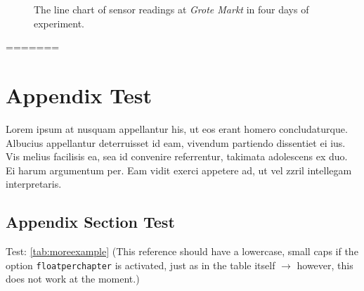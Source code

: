 \begin{figure}[H]
\begin{adjustwidth}{-2cm}{}
{{    }
  }
  \end{adjustwidth}
  \caption[The line chart of sensor readings at Grote Markt.]
  {The line chart of sensor readings at \textit{Grote Markt} in four days of experiment.}
  \label{fig:result-grotemarkt-line-chart}
\end{figure}
=======
\chapter{Appendix Test}
Lorem ipsum at nusquam appellantur his, ut eos erant homero
concludaturque. Albucius appellantur deterruisset id eam, vivendum
partiendo dissentiet ei ius. Vis melius facilisis ea, sea id convenire
referrentur, takimata adolescens ex duo. Ei harum argumentum per. Eam
vidit exerci appetere ad, ut vel zzril intellegam interpretaris.


\section{Appendix Section Test}
Test: \autoref{tab:moreexample} (This reference should have a 
lowercase, small caps  if the option 
\texttt{floatperchapter} is activated, just as in the table itself
 $\rightarrow$ however, this does not work at the moment.)

